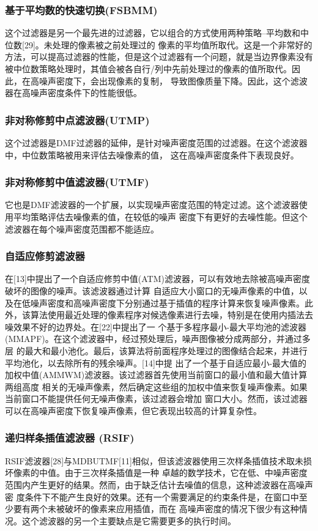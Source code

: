 \documentclass[12pt]{article} %
\begin{document}
\subsubsection{基于平均数的快速切换(FSBMM)}
这个过滤器是另一个最先进的过滤器，它以组合的方式使用两种策略--平均数和中位数[29]。未处理的像素被之前处理过的
像素的平均值所取代。这是一个非常好的方法，可以提高过滤器的性能，但是这个过滤器有一个问题，就是当边界像素没有
被中位数策略处理时，其值会被各自行/列中先前处理过的像素的值所取代。因此，在高噪声密度下，会出现像素的复制，
导致图像质量下降。因此，这个滤波器在高噪声密度条件下的性能很低。

\subsubsection{非对称修剪中点滤波器(UTMP)}
这个过滤器是DMF过滤器的延伸，是针对噪声密度范围的过滤器。在这个滤波器中，中位数策略被用来评估去噪像素的值，
这在高噪声密度条件下表现良好。

\subsubsection{非对称修剪中值滤波器(UTMF)}
它也是DMF滤波器的一个扩展，以实现噪声密度范围的特定过滤。这个滤波器使用平均策略评估去噪像素的值，在较低的噪声
密度下有更好的去噪性能。但这个滤波器在每个噪声密度范围都不能适应。

\subsubsection{自适应修剪滤波器}
在[13]中提出了一个自适应修剪中值(ATM)滤波器，可以有效地去除被高噪声密度破坏的图像的噪声。该滤波器通过计算
自适应大小窗口的无噪声像素的中值，以及在低噪声密度和高噪声密度下分别通过基于插值的程序计算来恢复噪声像素。此
外，该算法使用最近处理的像素程序对候选像素进行去噪，特别是在使用内插法去噪效果不好的边界处。在[22]中提出了一
个基于多程序最小-最大平均池的滤波器(MMAPF)。在这个滤波器中，经过预处理后，噪声图像被分成两部分，并通过多层
的最大和最小池化。最后，该算法将前面程序处理过的图像结合起来，并进行平均池化，以去除所有的残余噪声。[14]中提
出了一个基于自适应最小-最大值的加权中值(AMMWM)滤波器。该过滤器首先使用当前窗口的最小值和最大值计算两组高度
相关的无噪声像素，然后确定这些组的加权中值来恢复噪声像素。如果当前窗口不能提供任何无噪声像素，该过滤器会增加
窗口大小。然而，该过滤器可以在高噪声密度下恢复噪声像素，但它表现出较高的计算复杂性。

\subsubsection{递归样条插值滤波器 (RSIF)}
RSIF滤波器[28]与MDBUTMF[11]相似，但该滤波器使用三次样条插值技术取未损坏像素的中值。由于三次样条插值是一种
卓越的数学技术，它在低、中噪声密度范围内产生更好的结果。然而，由于缺乏估计去噪值的信息，这种滤波器在高噪声密
度条件下不能产生良好的效果。还有一个需要满足的约束条件是，在窗口中至少要有两个未被破坏的像素来应用插值，而在
高噪声密度的情况下很少有这种情况。这个滤波器的另一个主要缺点是它需要更多的执行时间。
\end{document}
